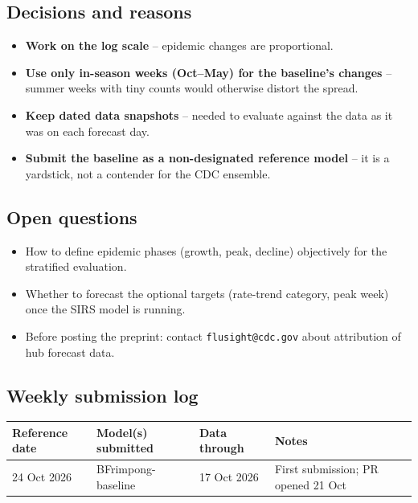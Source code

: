 \documentclass[11pt]{article}
\begin{document}
\subsection{Decisions and reasons}
\begin{itemize}[nosep]
  \item \textbf{Work on the log scale} -- epidemic changes are proportional.
  \item \textbf{Use only in-season weeks (Oct--May) for the baseline's changes} --
        summer weeks with tiny counts would otherwise distort the spread.
  \item \textbf{Keep dated data snapshots} -- needed to evaluate against the data as it
        was on each forecast day.
  \item \textbf{Submit the baseline as a non-designated reference model} -- it is a
        yardstick, not a contender for the CDC ensemble.
\end{itemize}

\subsection{Open questions}
\begin{itemize}[nosep]
  \item How to define epidemic phases (growth, peak, decline) objectively for the
        stratified evaluation.
  \item Whether to forecast the optional targets (rate-trend category, peak week)
        once the SIRS model is running.
  \item Before posting the preprint: contact \texttt{flusight@cdc.gov} about
        attribution of hub forecast data.
\end{itemize}

\subsection{Weekly submission log}
\begin{center}
\begin{tabular}{llll}
  \toprule
  Reference date & Model(s) submitted & Data through & Notes \\
  \midrule
    24 Oct 2026 & BFrimpong-baseline & 17 Oct 2026 & First submission; PR opened 21 Oct \\
  \bottomrule
\end{tabular}
\end{center}
\end{document}
